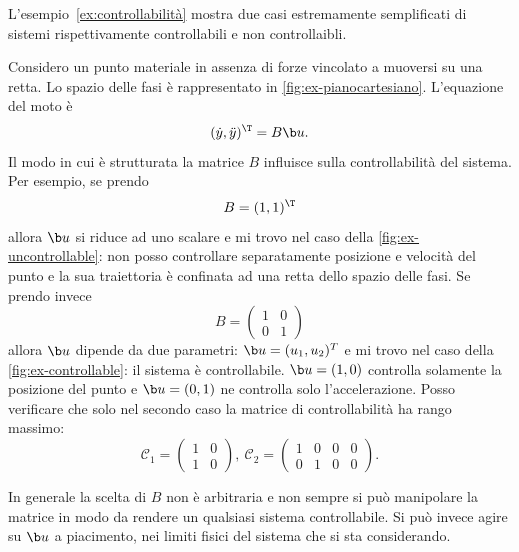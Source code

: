 L'esempio~\ref{ex:controllabilità} mostra due casi estremamente semplificati
di sistemi rispettivamente controllabili e non controllaibli.
\begin{example}
    Considero un punto materiale in assenza di forze vincolato a muoversi su una retta.
    Lo spazio delle fasi è rappresentato in \autoref{fig:ex-pianocartesiano}.
    L'equazione del moto è
    \begin{equation*}
        (\dot y, \ddot y)^\T = B\b u.
    \end{equation*}
    Il modo in cui è strutturata la matrice $B$ influisce sulla controllabilità del sistema.
    Per esempio, se prendo
    \begin{equation*}
        B = (1, 1)^{\T}
    \end{equation*}
    allora $\b u$ si riduce ad uno scalare e
    mi trovo nel caso della \autoref{fig:ex-uncontrollable}: non posso
    controllare separatamente posizione e velocità del punto e la sua traiettoria
    è confinata ad una retta dello spazio delle fasi.
    Se prendo invece
    \begin{equation*}
        B = \left(
        \begin{array}{cc}
            1 & 0 \\
            0 & 1
        \end{array}
        \right)
    \end{equation*}
    allora $\b u$ dipende da due parametri: $\b u = (u_1, u_2)^T$ e mi trovo
    nel caso della \autoref{fig:ex-controllable}: il sistema
    è controllabile. $\b u = (1, 0)$ controlla solamente la posizione del punto
    e $\b u = (0, 1)$ ne controlla solo l'accelerazione.
    Posso verificare che solo nel secondo caso la matrice di controllabilità
    ha rango massimo:
    \begin{equation*}
        \mathcal C_1 = \left(
        \begin{array}{cc}
            1 & 0 \\
            1 & 0
        \end{array}
        \right), \
        \mathcal C_2 = \left(
        \begin{array}{cccc}
            1 & 0 & 0 & 0\\
            0 & 1 & 0 & 0
        \end{array}
        \right).
    \end{equation*}

    In generale la scelta di $B$ non è arbitraria e non sempre si può
    manipolare la matrice in modo da rendere un qualsiasi sistema controllabile.
    Si può invece agire su $\b u$ a piacimento, nei limiti fisici del sistema
    che si sta considerando.


\end{example}
